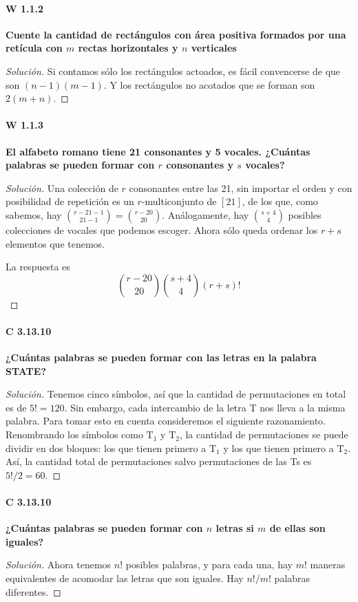 \documentclass[spanish]{book}
\theoremstyle{definition}
\begin{document}
\paragraph{W 1.1.2}\textbf{Cuente la cantidad de rectángulos con área positiva formados por una retícula con $m$ rectas horizontales y $n$ verticales}
\begin{proof}[Solución]
	Si contamos sólo los rectángulos actoados, es fácil convencerse de que son $(n-1)(m-1)$. Y los rectángulos no acotados que se forman son $2(m+n)$.
\end{proof}

\paragraph{W 1.1.3}\textbf{El alfabeto romano tiene 21 consonantes y 5 vocales. ¿Cuántas palabras se pueden formar con $r$ consonantes y $s$ vocales?}
\begin{proof}[Solución]
	Una colección de $r$ consonantes entre las 21, sin importar el orden y con posibilidad de repetición es un $r$-multiconjunto de $[21]$, de los que, como sabemos, hay ${r-21-1\choose21-1}={r-20\choose20}$. Análogamente, hay ${s+4\choose4}$ posibles colecciones de vocales que podemos escoger. Ahora sólo queda ordenar los $r+s$ elementos que tenemos.
	
	La respuesta es
	\[{r-20\choose20}{s+4\choose4}(r+s)!\]
\end{proof}
	
\paragraph{C 3.13.10} \textbf{¿Cuántas palabras se pueden formar con las letras en la palabra STATE?}
\begin{proof}[Solución]
	Tenemos cinco símbolos, así que la cantidad de permutaciones en total es de $5!=120$.  Sin embargo, cada intercambio de la letra T nos lleva a la misma palabra. Para tomar esto en cuenta consideremos el siguiente razonamiento. Renombrando los símbolos como $\text{T}_1$ y $\text{T}_2$, la cantidad de permutaciones se puede dividir en dos bloques: los que tienen primero a $\text{T}_1$ y los que tienen primero a $\text{T}_2$. Así, la cantidad total de permutaciones salvo permutaciones de las Ts es $5!/2=60$.
\end{proof}
\paragraph{C 3.13.10} \textbf{¿Cuántas palabras se pueden formar con $n$ letras si $m$ de ellas son iguales?}
\begin{proof}[Solución]
	Ahora tenemos $n!$ posibles palabras, y para cada una, hay $m!$ maneras equivalentes de acomodar las letras que son iguales. Hay $n!/m!$ palabras diferentes.
\end{proof}
\end{document}
